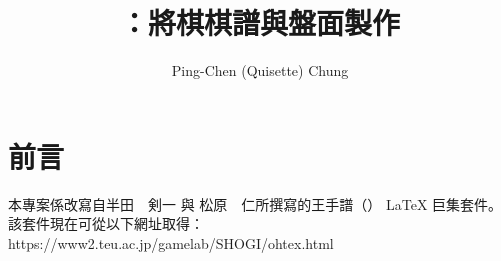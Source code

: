 \documentclass[a4paper, 10pt,]{article}
\begin{document}
\title{\RyuOhTeX：將棋棋譜與盤面製作}
\author{Ping-Chen (Quisette) Chung}

	\maketitle
	\tableofcontents

\setcounter{section}{-1}

\section{前言}
本專案係改寫自半田　剣一 與 松原　仁所撰寫的王手譜（\OhTeX） \LaTeX{} 巨集套件。\\
該套件現在可從以下網址取得：\\
https://www2.teu.ac.jp/gamelab/SHOGI/ohtex.html
\newpage
\newpage

\newpage

\newpage

\newpage
\end{document}
